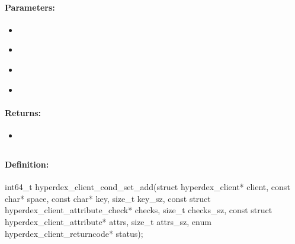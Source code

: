 \paragraph{Parameters:}
\begin{itemize}[noitemsep]
\item {}\\

\item {}\\

\item {}\\

\item {}\\

\end{itemize}

\paragraph{Returns:}
\begin{itemize}[noitemsep]
\item {}\\

\end{itemize}

\pagebreak
\subsection{}
\label{api:c:cond_set_add}


\paragraph{Definition:}
\begin{ccode}
int64_t hyperdex_client_cond_set_add(struct hyperdex_client* client,
        const char* space,
        const char* key, size_t key_sz,
        const struct hyperdex_client_attribute_check* checks, size_t checks_sz,
        const struct hyperdex_client_attribute* attrs, size_t attrs_sz,
        enum hyperdex_client_returncode* status);
\end{ccode}

